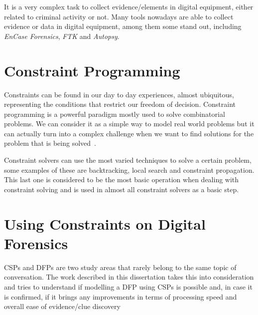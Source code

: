 It is a very complex task to collect evidence/elements in digital equipment,  either related to criminal activity or not. Many tools nowadays are able to collect evidence or data in digital equipment, among them some stand out, including \textit{EnCase Forensics}, \textit{\acf{FTK}} and \textit{Autopsy}.

\section{Constraint Programming}

Constraints can be found in our day to day experiences, almost ubiquitous, representing the conditions that restrict our freedom of decision. Constraint programming is a powerful paradigm mostly used to solve combinatorial problems. We can consider it as a simple way to model real world problems but it can actually turn into a complex challenge when we want to find solutions for the problem that is being solved~\cite{rossi2006handbook}. 

Constraint solvers can use the most varied techniques to solve a certain problem, some examples of these are backtracking, local search and constraint propagation. This last one is considered to be the most basic operation when dealing with constraint solving and is used in almost all constraint solvers as a basic step.

\section{Using Constraints on Digital Forensics}

\acfp{CSP} and \acfp{DFP} are two study areas that rarely belong to the same topic of conversation. The work described in this dissertation takes this into consideration and tries to understand if modelling a \acf{DFP} using \acfp{CSP} is possible and, in case it is confirmed, if it brings any improvements in terms of processing speed and overall ease of evidence/clue discovery